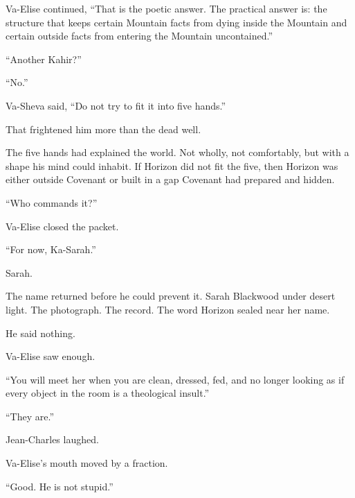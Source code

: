 Va-Elise continued, “That is the poetic answer. The practical answer is: the structure that keeps certain Mountain facts from dying inside the Mountain and certain outside facts from entering the Mountain uncontained.”\par

“Another Kahir?”\par

“No.”\par

Va-Sheva said, “Do not try to fit it into five hands.”\par

That frightened him more than the dead well.\par

The five hands had explained the world. Not wholly, not comfortably, but with a shape his mind could inhabit. If Horizon did not fit the five, then Horizon was either outside Covenant or built in a gap Covenant had prepared and hidden.\par

“Who commands it?”\par

Va-Elise closed the packet.\par

“For now, Ka-Sarah.”\par

Sarah.\par

The name returned before he could prevent it. Sarah Blackwood under desert light. The photograph. The record. The word Horizon sealed near her name.\par

He said nothing.\par

Va-Elise saw enough.\par

“You will meet her when you are clean, dressed, fed, and no longer looking as if every object in the room is a theological insult.”\par

“They are.”\par

Jean-Charles laughed.\par

Va-Elise’s mouth moved by a fraction.\par

“Good. He is not stupid.”\par

